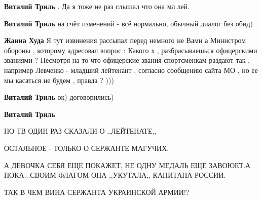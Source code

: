 \begin{itemize}
\begin{itemize}
 
\textbf{Виталий Триль} . Да я тоже не раз слышал что она мл.лей.

 
\textbf{Виталий Триль} на счёт изменений - всё нормально, обычный диалог без обид)

 
\textbf{Жанна Худа} Я тут извинения рассыпал перед немного не Вами а Министром
обороны , которому адресовал вопрос : Какого х , разбрасываешься офицерскими
званиями ? Несмотря на то что офицерские звания спортсменкам раздают так ,
например Левченко - младший лейтенант , согласно сообщению сайта МО , но ее мы
касаться не будем , правда ? )))

 
\textbf{Виталий Триль} ок) договорились)

 
\textbf{Виталий Триль} 

ПО ТВ ОДИН РАЗ СКАЗАЛИ О ,,ЛЕЙТЕНАТЕ,,

ОСТАЛЬНОЕ - ТОЛЬКО О СЕРЖАНТЕ МАГУЧИХ.

А ДЕВОЧКА СЕБЯ ЕЩЕ ПОКАЖЕТ, НЕ ОДНУ МЕДАЛЬ ЕЩЕ ЗАВОЮЕТ.А ПОКА...СВОИМ ФЛАГОМ
ОНА ,,УКУТАЛА,, КАПИТАНА РОССИИ.

ТАК В ЧЕМ ВИНА СЕРЖАНТА УКРАИНСКОЙ АРМИИ!?

\end{itemize}

\end{itemize}

